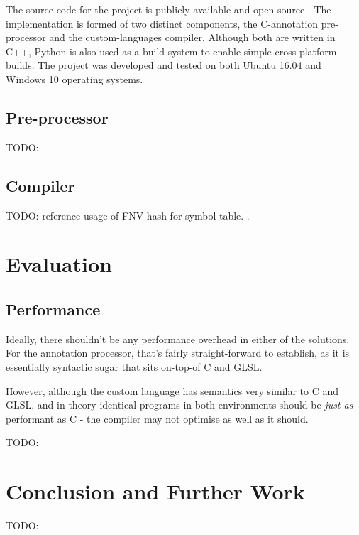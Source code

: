 \documentclass[a4paper,12pt,twoside,openright]{report}
\begin{document}

The source code for the project is publicly available and open-source
\cite{ProjectSource}. The implementation is formed of two distinct components,
the C-annotation pre-processor and the custom-languages compiler. Although both
are written in C++, Python is also used as a build-system to enable simple
cross-platform builds. The project was developed and tested on both Ubuntu
16.04 and Windows 10 operating systems.


\section{Pre-processor}

TODO:

\section{Compiler}

TODO: reference usage of FNV hash for symbol table. \cite{FNVHash}.


\chapter{Evaluation}



\section{Performance}

Ideally, there shouldn't be any performance overhead in either of the
solutions. For the annotation processor, that's fairly straight-forward to
establish, as it is essentially syntactic sugar that sits on-top-of C and GLSL.

However, although the custom language has semantics very similar to C and GLSL,
and in theory identical programs in both environments should be \textit{just
as} performant as C - the compiler may not optimise as well as it should.

TODO:


\chapter{Conclusion and Further Work}



TODO:

\appendix
\singlespacing



\end{document}
